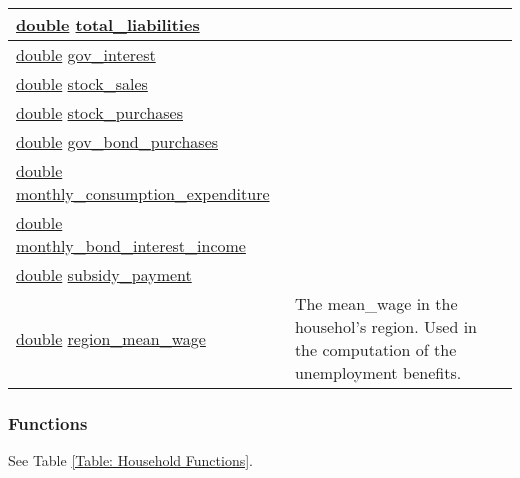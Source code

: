 \documentclass[a4paper,11pt]{article}
\begin{document}
\begin{landscape}
\begin{longtable}[H!]{ll}
\midrule
\url{double} \url{total_liabilities} & \parbox{10cm}{} \\
\midrule
\url{double} \url{gov_interest} & \parbox{10cm}{} \\
\midrule
\url{double} \url{stock_sales} & \parbox{10cm}{} \\
\midrule
\url{double} \url{stock_purchases} & \parbox{10cm}{} \\
\midrule
\url{double} \url{gov_bond_purchases} & \parbox{10cm}{} \\
\midrule
\url{double} \url{monthly_consumption_expenditure} & \parbox{10cm}{} \\
\midrule
\url{double} \url{monthly_bond_interest_income} & \parbox{10cm}{} \\
\midrule
\url{double} \url{subsidy_payment} & \parbox{10cm}{} \\
\midrule
\url{double} \url{region_mean_wage} & \parbox{10cm}{The mean\_wage in the househol's region. Used in the computation of the unemployment benefits.} \\
\end{longtable}
\end{landscape}

\subsubsection{Functions}
See Table \ref{Table: Household Functions}.
\end{document}
